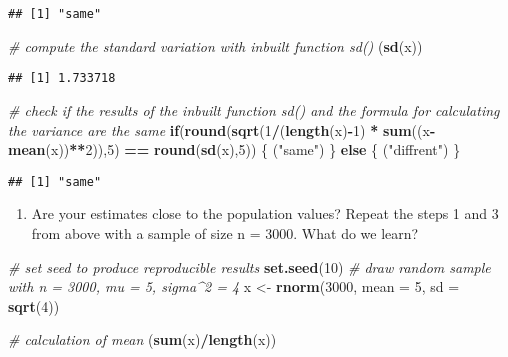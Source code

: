 \documentclass[
]{article}
\newenvironment{Shaded}{\begin{snugshade}}{\end{snugshade}}
\newcommand{\CommentTok}[1]{\textcolor[rgb]{0.56,0.35,0.01}{\textit{#1}}}
\newcommand{\ControlFlowTok}[1]{\textcolor[rgb]{0.13,0.29,0.53}{\textbf{#1}}}
\newcommand{\DataTypeTok}[1]{\textcolor[rgb]{0.13,0.29,0.53}{#1}}
\newcommand{\DecValTok}[1]{\textcolor[rgb]{0.00,0.00,0.81}{#1}}
\newcommand{\KeywordTok}[1]{\textcolor[rgb]{0.13,0.29,0.53}{\textbf{#1}}}
\newcommand{\NormalTok}[1]{#1}
\newcommand{\OperatorTok}[1]{\textcolor[rgb]{0.81,0.36,0.00}{\textbf{#1}}}
\newcommand{\StringTok}[1]{\textcolor[rgb]{0.31,0.60,0.02}{#1}}
\providecommand{\tightlist}{%
  \setlength{\itemsep}{0pt}\setlength{\parskip}{0pt}}
\begin{document}
\begin{verbatim}
## [1] "same"
\end{verbatim}

\begin{Shaded}
\begin{Highlighting}[]
\CommentTok{# compute the standard variation with inbuilt function sd()}
\NormalTok{(}\KeywordTok{sd}\NormalTok{(x))}
\end{Highlighting}
\end{Shaded}

\begin{verbatim}
## [1] 1.733718
\end{verbatim}

\begin{Shaded}
\begin{Highlighting}[]
\CommentTok{# check if the results of the inbuilt function sd() and the formula for calculating the variance are the same }
\ControlFlowTok{if}\NormalTok{(}\KeywordTok{round}\NormalTok{(}\KeywordTok{sqrt}\NormalTok{(}\DecValTok{1}\OperatorTok{/}\NormalTok{(}\KeywordTok{length}\NormalTok{(x)}\OperatorTok{-}\DecValTok{1}\NormalTok{) }\OperatorTok{*}\StringTok{ }\KeywordTok{sum}\NormalTok{((x}\OperatorTok{-}\KeywordTok{mean}\NormalTok{(x))}\OperatorTok{**}\DecValTok{2}\NormalTok{)),}\DecValTok{5}\NormalTok{) }\OperatorTok{==}\StringTok{ }\KeywordTok{round}\NormalTok{(}\KeywordTok{sd}\NormalTok{(x),}\DecValTok{5}\NormalTok{)) \{}
\NormalTok{  (}\StringTok{"same"}\NormalTok{)}
\NormalTok{\} }\ControlFlowTok{else}\NormalTok{ \{}
\NormalTok{  (}\StringTok{"diffrent"}\NormalTok{)}
\NormalTok{\}}
\end{Highlighting}
\end{Shaded}

\begin{verbatim}
## [1] "same"
\end{verbatim}

\begin{enumerate}
\def\labelenumi{\arabic{enumi}.}
\setcounter{enumi}{3}
\tightlist
\item
  Are your estimates close to the population values? Repeat the steps 1
  and 3 from above with a sample of size n = 3000. What do we learn?
\end{enumerate}

\begin{Shaded}
\begin{Highlighting}[]
\CommentTok{# set seed to produce reproducible results}
\KeywordTok{set.seed}\NormalTok{(}\DecValTok{10}\NormalTok{)}
\CommentTok{# draw random sample with n = 3000, mu = 5, sigma^2 = 4}
\NormalTok{x <-}\StringTok{ }\KeywordTok{rnorm}\NormalTok{(}\DecValTok{3000}\NormalTok{, }\DataTypeTok{mean =} \DecValTok{5}\NormalTok{, }\DataTypeTok{sd =} \KeywordTok{sqrt}\NormalTok{(}\DecValTok{4}\NormalTok{))}

\CommentTok{# calculation of mean}
\NormalTok{(}\KeywordTok{sum}\NormalTok{(x)}\OperatorTok{/}\KeywordTok{length}\NormalTok{(x))}
\end{Highlighting}
\end{Shaded}
\end{document}
